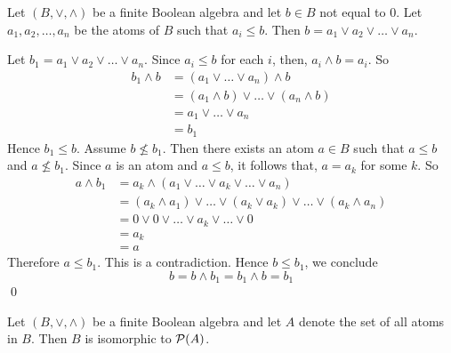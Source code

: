 \begin{lemma}
\label{arom_present}
   Let \((B,\vee,\wedge)\) be a finite Boolean algebra and let \(b\in B\) not equal to \(0\). Let \(a_1,a_2,\dots,a_n\) be the atoms of \(B\) such that \(a_i\leq b\). Then \(b=a_1\vee a_2\vee\dots\vee a_n\).
\end{lemma}

\begin{myproof}
    Let \(b_1=a_1\vee a_2\vee\dots\vee a_n\). Since \(a_i\leq b\) for each \(i\), then, \(a_i\wedge b=a_i\). So
    \begin{align*}
        b_1\wedge b&=(a_1\vee\dots\vee a_n)\wedge b\\
        &=(a_1\wedge b)\vee\dots\vee(a_n\wedge b)\\
        &=a_1\vee\dots\vee a_n\\
        &=b_1
    \end{align*}
    Hence \(b_1\leq b\). Assume \(b\nleq b_1\). Then there exists an atom \(a\in B\) such that \(a\leq b\) and \(a\nleq b_1\). Since \(a\) is an atom and \(a\leq b\), it follows that, \(a=a_k\) for some \(k\). So
    \begin{align*}
        a\wedge b_1&=a_k\wedge(a_1\vee\dots\vee a_k\vee\dots\vee a_n)\\
        &=(a_k\wedge a_1)\vee\dots\vee(a_k\vee a_k)\vee\dots\vee(a_k\wedge a_n)\\
        &=0\vee0\vee\dots\vee a_k\vee\dots\vee 0\\
        &=a_k\\
        &=a
    \end{align*}
    Therefore \(a\leq b_1\). This is a contradiction. Hence \(b\leq b_1\), we conclude
    \[
    b=b\wedge b_1=b_1\wedge b=b_1
    \]\qed
\end{myproof}

\begin{theo}
    Let \((B,\vee,\wedge)\) be a finite Boolean algebra and let \(A\) denote the set of all atoms in \(B\). Then \(B\) is isomorphic to \(\mathcal{P}(A)\).
\end{theo}

